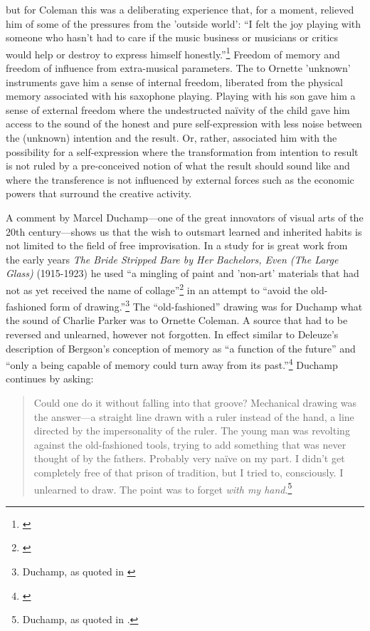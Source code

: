 but for Coleman this was a deliberating experience that, for a moment,
relieved him of some of the pressures from the 'outside world': ``I
felt the joy playing with someone who hasn't had to care if the music
business or musicians or critics would help or destroy to express
himself honestly.''\footnote{\citet[Ornette Coleman quoted
  in][p. 121]{litzweiler92}} Freedom of memory and freedom of influence
from extra-musical parameters. The to Ornette 'unknown' instruments
gave him a sense of internal freedom, liberated from the physical
memory associated with his saxophone playing. Playing with his son
gave him a sense of external freedom where the undestructed
na\"{i}vity of the child gave him access to the sound of the honest
and pure self-expression with less noise between the (unknown)
intention and the result. Or, rather, associated him with the
possibility for a self-expression where the transformation from
intention to result is not ruled by a pre-conceived notion of what the
result should sound like and where the transference is not influenced
by external forces such as the economic powers that surround the
creative activity.

A comment by Marcel Duchamp---one of the great innovators of visual
arts of the 20th century---shows us that the wish to outsmart learned
and inherited habits is not limited to the field of free
improvisation. In a study for is great work from the early years
\emph{The Bride Stripped Bare by Her Bachelors, Even (The Large
  Glass)} (1915-1923) he used ``a mingling of paint and 'non-art'
materials that had not as yet received the name of
collage''\footnote{\citet[p. 29]{tomkins65}} in an attempt to ``avoid the
old-fashioned form of drawing.''\footnote{Duchamp, as quoted
in \citet[p. 29]{tomkins65}} The ``old-fashioned'' drawing was for Duchamp what
the sound of Charlie Parker was to Ornette Coleman. A source that had
to be reversed and unlearned, however not forgotten. In effect similar
to Deleuze's description of Bergson's conception of memory as ``a
function of the future'' and ``only a being capable of memory could
turn away from its past.''\footnote{\citet[p. 45]{deleuze02}} Duchamp continues
by asking:

\begin{quote}
  Could one do it without falling into that groove? Mechanical drawing
  was the answer---a straight line drawn with a ruler instead of the
  hand, a line directed by the impersonality of the ruler. The young
  man was revolting against the old-fashioned tools, trying to add
  something that was never thought of by the fathers. Probably very
  na\"{i}ve on my part. I didn't get completely free of that prison of
  tradition, but I tried to, consciously. I unlearned to draw. The
  point was to forget \emph{with my hand}.\footnote{Duchamp, as quoted
    in \citet[p. 29]{tomkins65}.}
\end{quote}

